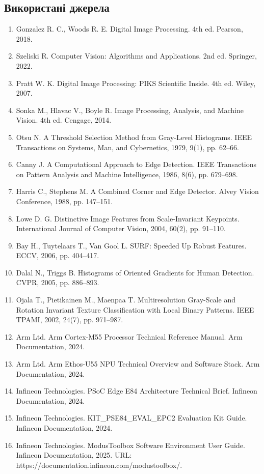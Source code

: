 \documentclass[a4paper,12pt]{article}
\begin{document}
\subsection*{Використані джерела}
\begin{enumerate}
	\item Gonzalez R. C., Woods R. E. Digital Image Processing. 4th ed. Pearson, 2018.
	\item Szeliski R. Computer Vision: Algorithms and Applications. 2nd ed. Springer, 2022.
	\item Pratt W. K. Digital Image Processing: PIKS Scientific Inside. 4th ed. Wiley, 2007.
	\item Sonka M., Hlavac V., Boyle R. Image Processing, Analysis, and Machine Vision. 4th ed. Cengage, 2014.
	\item Otsu N. A Threshold Selection Method from Gray-Level Histograms. IEEE Transactions on Systems, Man, and Cybernetics, 1979, 9(1), pp. 62--66.
	\item Canny J. A Computational Approach to Edge Detection. IEEE Transactions on Pattern Analysis and Machine Intelligence, 1986, 8(6), pp. 679--698.
	\item Harris C., Stephens M. A Combined Corner and Edge Detector. Alvey Vision Conference, 1988, pp. 147--151.
	\item Lowe D. G. Distinctive Image Features from Scale-Invariant Keypoints. International Journal of Computer Vision, 2004, 60(2), pp. 91--110.
	\item Bay H., Tuytelaars T., Van Gool L. SURF: Speeded Up Robust Features. ECCV, 2006, pp. 404--417.
	\item Dalal N., Triggs B. Histograms of Oriented Gradients for Human Detection. CVPR, 2005, pp. 886--893.
	\item Ojala T., Pietikainen M., Maenpaa T. Multiresolution Gray-Scale and Rotation Invariant Texture Classification with Local Binary Patterns. IEEE TPAMI, 2002, 24(7), pp. 971--987.
	\item Arm Ltd. Arm Cortex-M55 Processor Technical Reference Manual. Arm Documentation, 2024.
	\item Arm Ltd. Arm Ethos-U55 NPU Technical Overview and Software Stack. Arm Documentation, 2024.
	\item Infineon Technologies. PSoC Edge E84 Architecture Technical Brief. Infineon Documentation, 2024.
	\item Infineon Technologies. KIT\_PSE84\_EVAL\_EPC2 Evaluation Kit Guide. Infineon Documentation, 2024.
	\item Infineon Technologies. ModusToolbox\texttrademark{} Software Environment User Guide. Infineon Documentation, 2025. URL: https://documentation.infineon.com/modustoolbox/.

\end{enumerate}
\end{document}
